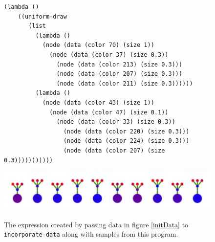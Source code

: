 \documentclass[a4paper,10pt]{article}
\begin{document}
\begin{figure}[h]
\begin{center}
\begin{verbatim}
(lambda ()
    ((uniform-draw
       (list
         (lambda ()
           (node (data (color 70) (size 1))
             (node (data (color 37) (size 0.3))
               (node (data (color 213) (size 0.3)))
               (node (data (color 207) (size 0.3)))
               (node (data (color 211) (size 0.3))))))
         (lambda ()
           (node (data (color 43) (size 1))
             (node (data (color 47) (size 0.1))
               (node (data (color 33) (size 0.3))
                 (node (data (color 220) (size 0.3)))
                 (node (data (color 224) (size 0.3)))
                 (node (data (color 207) (size 0.3)))))))))))
\end{verbatim}
\includegraphics[scale=.7]{initProgram.pdf}
\label{initProgram}
\caption{The expression created by passing data in figure \ref{initData} to \texttt{incorporate-data} along with samples from this program.}
\end{center}
\end{figure}
\end{document}
